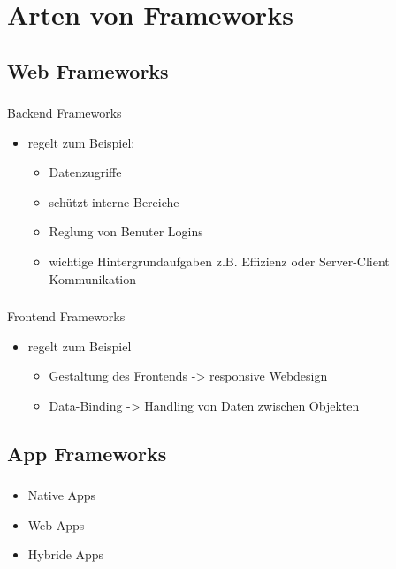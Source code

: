 \documentclass[aspectratio=169,14pt,xcolor=dvipsnames]{beamer}
\begin{document}
\section{Arten von Frameworks}
\subsection{Web Frameworks}
\begin{frame}[t]
    \frametitle{\subsecname}
    \framesubtitle{\secname}
    Backend Frameworks
    \begin{itemize}
        \setlength{\itemsep}{1.5em}
        \item regelt zum Beispiel:
        \begin{itemize}
            \setlength{\itemsep}{1.5em}
            \item Datenzugriffe
            \item schützt interne Bereiche
            \item Reglung von Benuter Logins
            \item wichtige Hintergrundaufgaben z.B. Effizienz oder Server-Client Kommunikation
        \end{itemize}
    \end{itemize}
\end{frame}

\begin{frame}[t]
    \frametitle{\subsecname}
    \framesubtitle{\secname}
    Frontend Frameworks
    \begin{itemize}
        \setlength{\itemsep}{1.5em}
        \item regelt zum Beispiel
        \begin{itemize}
            \setlength{\itemsep}{1.5em}
            \item Gestaltung des Frontends -> responsive Webdesign
            \item Data-Binding -> Handling von Daten zwischen Objekten
        \end{itemize}
    \end{itemize}
\end{frame}

\subsection{App Frameworks}
\begin{frame}[t]
    \frametitle{\subsecname}
    \framesubtitle{\secname}
    \begin{itemize}
        \setlength{\itemsep}{1.5em}
        \item Native Apps
        \item Web Apps
        \item Hybride Apps
    \end{itemize}
\end{frame}
\end{document}
